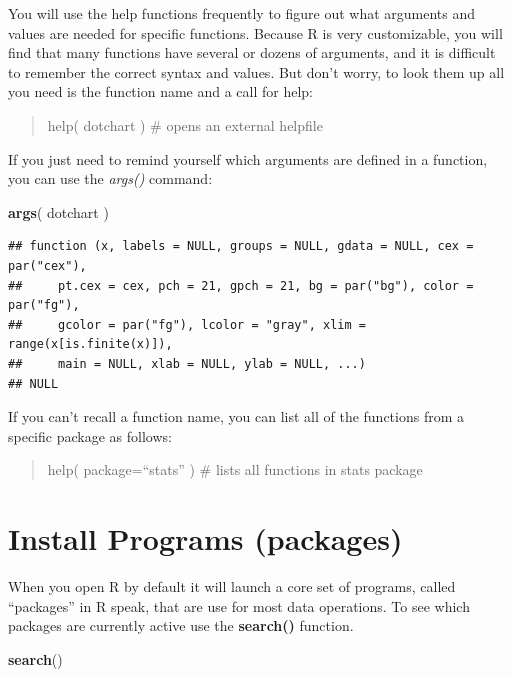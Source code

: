 \documentclass[]{book}
\newenvironment{Shaded}{\begin{snugshade}}{\end{snugshade}}
\newcommand{\KeywordTok}[1]{\textcolor[rgb]{0.13,0.29,0.53}{\textbf{#1}}}
\newcommand{\NormalTok}[1]{#1}
\theoremstyle{definition}
\theoremstyle{definition}
\theoremstyle{definition}
\theoremstyle{remark}
\begin{document}
You will use the help functions frequently to figure out what arguments
and values are needed for specific functions. Because R is very
customizable, you will find that many functions have several or dozens
of arguments, and it is difficult to remember the correct syntax and
values. But don't worry, to look them up all you need is the function
name and a call for help:

\begin{quote}
help( dotchart ) \# opens an external helpfile
\end{quote}

If you just need to remind yourself which arguments are defined in a
function, you can use the \emph{args()} command:

\begin{Shaded}
\begin{Highlighting}[]
\KeywordTok{args}\NormalTok{( dotchart )}
\end{Highlighting}
\end{Shaded}

\begin{verbatim}
## function (x, labels = NULL, groups = NULL, gdata = NULL, cex = par("cex"), 
##     pt.cex = cex, pch = 21, gpch = 21, bg = par("bg"), color = par("fg"), 
##     gcolor = par("fg"), lcolor = "gray", xlim = range(x[is.finite(x)]), 
##     main = NULL, xlab = NULL, ylab = NULL, ...) 
## NULL
\end{verbatim}

If you can't recall a function name, you can list all of the functions
from a specific package as follows:

\begin{quote}
help( package=``stats'' ) \# lists all functions in stats package
\end{quote}

\hypertarget{install-programs-packages}{%
\section{Install Programs (packages)}\label{install-programs-packages}}

When you open R by default it will launch a core set of programs, called
``packages'' in R speak, that are use for most data operations. To see
which packages are currently active use the \textbf{search()} function.

\begin{Shaded}
\begin{Highlighting}[]
\KeywordTok{search}\NormalTok{()}
\end{Highlighting}
\end{Shaded}
\end{document}
